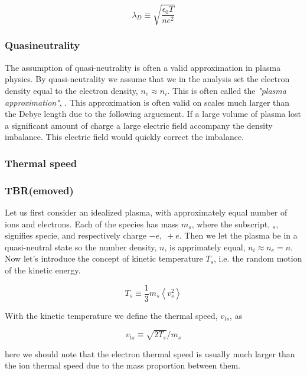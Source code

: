 		\begin{equation}
			\lambda_D \equiv \sqrt{\frac{\epsilon_0 T}{n e^2}}
		\end{equation}

		\subsubsection{Quasineutrality}
		The assumption of quasi-neutrality is often a valid approximation in plasma
		physics. By quasi-neutrality we assume that we in the analysis set the electron
		density equal to the electron density, \(n_e \approx n_i\). This is often called the
		\textit{"plasma approximation"}, \citep{chen_introduction_1984}. This approximation is often valid on scales
		much larger than the Debye length due to the following arguement. If a
		large volume of plasma lost a significant amount of charge a large electric
		field accompany the density imbalance. This electric field would quickly correct
		the imbalance.

		\subsubsection{Thermal speed}

		\citet{goldston_introduction_1995}

		\subsubsection{TBR(emoved)}
        Let us first consider an idealized plasma, with approximately equal number
        of ions and electrons. Each of the species has mass \(m_s\), where the
        subscript, \(_s\), signifies specie, and respectively charge \(-e, \; +e\). Then we let the plasma be in a quasi-neutral state
        so the number density, \(n\), is apprimately equal, \(n_i\approx n_e = n\).
        Now let's introduce the concept of kinetic temperature \(T_s\), i.e. the random
        motion of the kinetic energy.

        \[T_s \equiv \frac{1}{3}m_s \left< v_s^2 \right> \]

        With the kinetic temperature we define the thermal speed, \(v_{ts}\), as

        \[ v_{ts} \equiv \sqrt{2T_s}/m_s \]

        here we should note that the electron thermal speed is usually much larger
        than the ion thermal speed due to the mass proportion between them.

